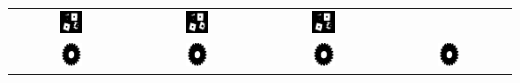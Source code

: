 \documentclass[main]{subfiles}
\begin{document}
\begin{table}
\begin{tabular}{c||c|c|c}
\includegraphics[width=0.2\textwidth]{img/res/e1a/alg1tipo6-block.jpg} &
\includegraphics[width=0.2\textwidth]{img/res/e1a/alg1tipo6d0.75-block.jpg} &
\includegraphics[width=0.2\textwidth]{img/res/e1a/alg1tipo6d1.25-block.jpg} \\
\includegraphics[width=0.2\textwidth]{img/res/e1a/alg1tipo1-02.jpg} &
\includegraphics[width=0.2\textwidth]{img/res/e1a/alg1tipo6-02.jpg} &
\includegraphics[width=0.2\textwidth]{img/res/e1a/alg1tipo6d0.75-02.jpg} &
\includegraphics[width=0.2\textwidth]{img/res/e1a/alg1tipo6d1.25-02.jpg} \\

\end{tabular}
\end{table}
\end{document}
